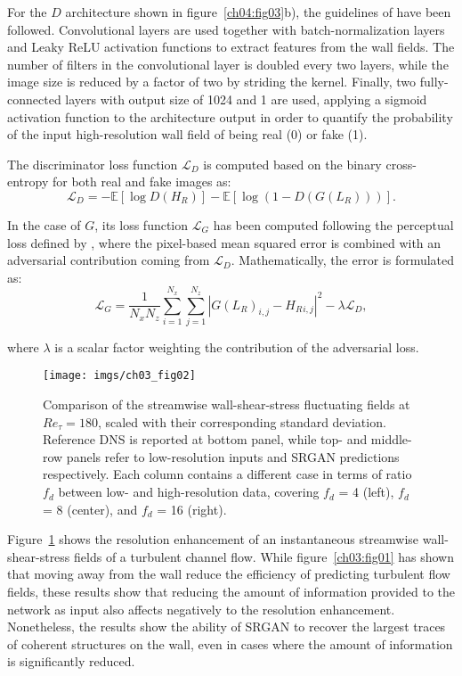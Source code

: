 For the $D$ architecture shown in figure~\ref{ch04:fig03}b), the guidelines of \citet{radford2015unsupervised} have been followed.
Convolutional layers are used together with batch-normalization layers and Leaky ReLU \citep{maas2013rectifier} activation functions to extract features from the wall fields.
The number of filters in the convolutional layer is doubled every two layers, while the image size is reduced by a factor of two by striding the kernel.
Finally, two fully-connected layers with output size of 1024 and 1 are used, applying a sigmoid activation function to the architecture output in order to quantify the probability of the input high-resolution wall field of being real (0) or fake (1).

The discriminator loss function $\mathcal{L}_D$ is computed based on the binary cross-entropy for both real and fake images as:
\begin{equation}
    \mathcal{L}_D=-\mathbb{E}[\log D(H_R)] - \mathbb{E}[\log(1-D(G(L_R)))].
\end{equation}

In the case of $G$, its loss function $\mathcal{L}_G$ has been computed following the perceptual loss defined by \citet{ledig2017photo}, where the pixel-based mean squared error is combined with an adversarial contribution coming from $\mathcal{L}_D$.
Mathematically, the error is formulated as:
\begin{equation}
    \mathcal{L}_G=\frac{1}{N_xN_z}\sum^{N_x}_{i=1}\sum^{N_z}_{j=1}|G(L_R)_{i,j} - H_R{_{i,j}}|^2 - \lambda \mathcal{L}_D,
\end{equation}

\noindent where $\lambda$ is a scalar factor weighting the contribution of the adversarial loss.
\begin{figure}
  \centering
  \texttt{[image: imgs/ch03\_fig02]}
  \caption{\label{ch03:fig02}Comparison of the streamwise wall-shear-stress fluctuating fields at $Re_{\tau}=180$, scaled with their corresponding standard deviation. Reference DNS is reported at bottom panel, while top- and middle-row panels refer to low-resolution inputs and SRGAN predictions respectively. Each column contains a different case in terms of ratio $f_d$ between low- and high-resolution data, covering $f_d$ = 4 (left), $f_d$ = 8 (center), and $f_d$ = 16 (right).}
\end{figure}
Figure~\ref{ch03:fig02} shows the resolution enhancement of an instantaneous streamwise wall-shear-stress fields of a turbulent channel flow.
While figure~\ref{ch03:fig01} has shown that moving away from the wall reduce the efficiency of predicting turbulent flow fields, these results show that reducing the amount of information provided to the network as input also affects negatively to the resolution enhancement.
Nonetheless, the results show the ability of SRGAN to recover the largest traces of coherent structures on the wall, even in cases where the amount of information is significantly reduced.

